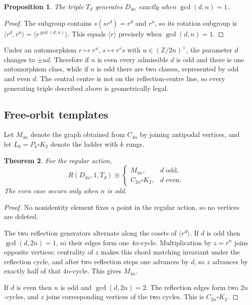 \documentclass[11pt]{article}
\newtheorem{theorem}{Theorem}[section]
\newtheorem{proposition}[theorem]{Proposition}
\theoremstyle{definition}
\theoremstyle{remark}
\newcommand{\Z}{\mathbb{Z}}
\newcommand{\Cyc}{C}
\newcommand{\Mob}{M}
\begin{document}
\begin{proposition}
\label{prop:Td-generates}
The triple $T_d$ generates $D_{4n}$ exactly when $\gcd(d,n)=1$.
\end{proposition}

\begin{proof}
The subgroup contains $s(sr^d)=r^d$ and $r^n$, so its rotation subgroup is
$\langle r^d,r^n\rangle=\langle r^{\gcd(d,n)}\rangle$. This equals $\langle r\rangle$ precisely when
$\gcd(d,n)=1$.
\end{proof}

Under an automorphism $r\mapsto r^u$, $s\mapsto r^v s$ with $u\in(\Z/2n)^\times$, the parameter $d$
changes to $\pm ud$. Therefore if $n$ is even every admissible $d$ is odd and there is one
automorphism class, while if $n$ is odd there are two classes, represented by odd and even $d$. The
central centre is not on the reflection-centre line, so every generating triple described above is
geometrically legal.

\subsection{Free-orbit templates}

Let $\Mob_{4n}$ denote the graph obtained from $\Cyc_{4n}$ by joining antipodal vertices, and let
$L_k=P_k\square K_2$ denote the ladder with $k$ rungs.

\begin{theorem}
\label{thm:free-template}
For the regular action,
\begin{equation}
  R(D_{4n},1,T_d)\cong
  \begin{cases}
    \Mob_{4n}, & d\text{ odd},\\
    \Cyc_{2n}\square K_2, & d\text{ even}.
  \end{cases}
  \label{eq:free-template}
\end{equation}
The even case occurs only when $n$ is odd.
\end{theorem}

\begin{proof}
No nonidentity element fixes a point in the regular action, so no vertices are deleted.

The two reflection generators alternate along the cosets of $\langle r^d\rangle$. If $d$ is odd then
$\gcd(d,2n)=1$, so their edges form one $4n$-cycle. Multiplication by $z=r^n$ joins opposite
vertices: centrality of $z$ makes this chord matching invariant under the reflection cycle, and
after two reflection steps one advances by $d$, so $z$ advances by exactly half of that $4n$-cycle.
This gives $\Mob_{4n}$.

If $d$ is even then $n$ is odd and $\gcd(d,2n)=2$. The reflection edges form two $2n$-cycles, and
$z$ joins corresponding vertices of the two cycles. This is $\Cyc_{2n}\square K_2$.
\end{proof}
\end{document}
